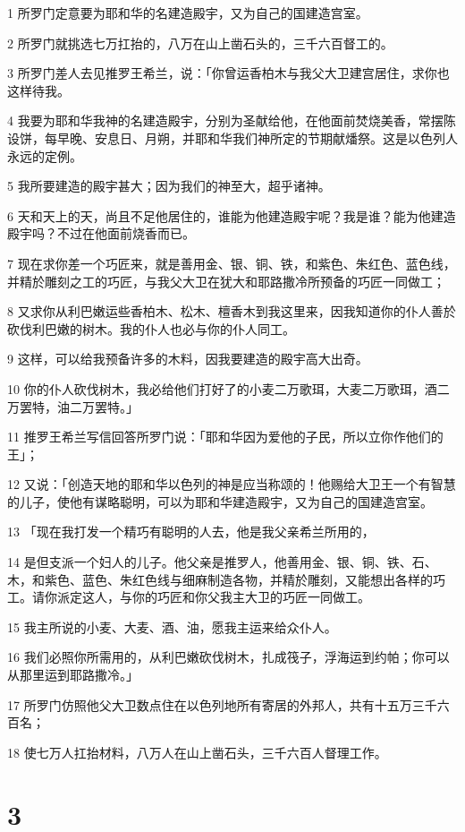 \par 1 所罗门定意要为耶和华的名建造殿宇，又为自己的国建造宫室。
\par 2 所罗门就挑选七万扛抬的，八万在山上凿石头的，三千六百督工的。
\par 3 所罗门差人去见推罗王希兰，说：「你曾运香柏木与我父大卫建宫居住，求你也这样待我。
\par 4 我要为耶和华我神的名建造殿宇，分别为圣献给他，在他面前焚烧美香，常摆陈设饼，每早晚、安息日、月朔，并耶和华我们神所定的节期献燔祭。这是以色列人永远的定例。
\par 5 我所要建造的殿宇甚大；因为我们的神至大，超乎诸神。
\par 6 天和天上的天，尚且不足他居住的，谁能为他建造殿宇呢？我是谁？能为他建造殿宇吗？不过在他面前烧香而已。
\par 7 现在求你差一个巧匠来，就是善用金、银、铜、铁，和紫色、朱红色、蓝色线，并精於雕刻之工的巧匠，与我父大卫在犹大和耶路撒冷所预备的巧匠一同做工；
\par 8 又求你从利巴嫩运些香柏木、松木、檀香木到我这里来，因我知道你的仆人善於砍伐利巴嫩的树木。我的仆人也必与你的仆人同工。
\par 9 这样，可以给我预备许多的木料，因我要建造的殿宇高大出奇。
\par 10 你的仆人砍伐树木，我必给他们打好了的小麦二万歌珥，大麦二万歌珥，酒二万罢特，油二万罢特。」
\par 11 推罗王希兰写信回答所罗门说：「耶和华因为爱他的子民，所以立你作他们的王」；
\par 12 又说：「创造天地的耶和华以色列的神是应当称颂的！他赐给大卫王一个有智慧的儿子，使他有谋略聪明，可以为耶和华建造殿宇，又为自己的国建造宫室。
\par 13 「现在我打发一个精巧有聪明的人去，他是我父亲希兰所用的，
\par 14 是但支派一个妇人的儿子。他父亲是推罗人，他善用金、银、铜、铁、石、木，和紫色、蓝色、朱红色线与细麻制造各物，并精於雕刻，又能想出各样的巧工。请你派定这人，与你的巧匠和你父我主大卫的巧匠一同做工。
\par 15 我主所说的小麦、大麦、酒、油，愿我主运来给众仆人。
\par 16 我们必照你所需用的，从利巴嫩砍伐树木，扎成筏子，浮海运到约帕；你可以从那里运到耶路撒冷。」
\par 17 所罗门仿照他父大卫数点住在以色列地所有寄居的外邦人，共有十五万三千六百名；
\par 18 使七万人扛抬材料，八万人在山上凿石头，三千六百人督理工作。

\chapter{3}

